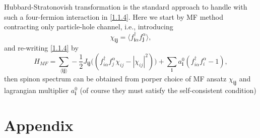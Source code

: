 \documentclass[10pt,nofootinbib]{revtex4}
\begin{document}
		Hubbard-Stratonovish transformation is the standard approach to handle with such a four-fermion interaction in \eqref{1.1.4}. Here we start by MF method contracting only particle-hole channel, i.e., introducing
		\begin{equation}
			\chi_{\bm{ij}}=\langle f_{\bm{i}\alpha}^\dagger f_{\bm{j}}^\alpha\rangle,
		\end{equation}
		and re-writing \eqref{1.1.4} by 
		\begin{equation}\label{2.1.1}
			H_{MF}=\sum_{\langle\bm{ij}\rangle}-\dfrac{1}{2}J_{\bm{ij}}\bigg((f_{i \alpha}^\dagger f_j^\alpha\chi_{ij}-|\chi_{ij}|^2)\bigg)+\sum_{\bm{i}}a_{\bm{i}}^0(f_{i \alpha}^\dagger f_{i}^\alpha-1),
		\end{equation}
		then spinon spectrum can be obtained from porper choice of MF ansatz $\chi_{\bm{ij}}$ and lagrangian multiplier $a^0_{\bm{i}}$ (of course they must satisfy the self-consistent condition) 
\fi



\iffalse
\section{Appendix}
\end{document}
